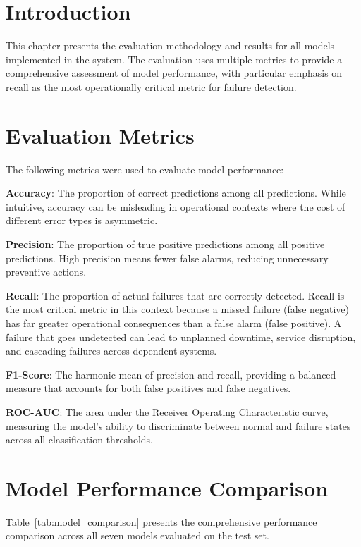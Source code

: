 \documentclass[12pt,letterpaper]{report}
\begin{document}
\section{Introduction}

This chapter presents the evaluation methodology and results for all models implemented in the system. The evaluation uses multiple metrics to provide a comprehensive assessment of model performance, with particular emphasis on recall as the most operationally critical metric for failure detection.

\section{Evaluation Metrics}

The following metrics were used to evaluate model performance:

\textbf{Accuracy}: The proportion of correct predictions among all predictions. While intuitive, accuracy can be misleading in operational contexts where the cost of different error types is asymmetric.

\textbf{Precision}: The proportion of true positive predictions among all positive predictions. High precision means fewer false alarms, reducing unnecessary preventive actions.

\textbf{Recall}: The proportion of actual failures that are correctly detected. Recall is the most critical metric in this context because a missed failure (false negative) has far greater operational consequences than a false alarm (false positive). A failure that goes undetected can lead to unplanned downtime, service disruption, and cascading failures across dependent systems.

\textbf{F1-Score}: The harmonic mean of precision and recall, providing a balanced measure that accounts for both false positives and false negatives.

\textbf{ROC-AUC}: The area under the Receiver Operating Characteristic curve, measuring the model's ability to discriminate between normal and failure states across all classification thresholds.

\section{Model Performance Comparison}

Table~\ref{tab:model_comparison} presents the comprehensive performance comparison across all seven models evaluated on the test set.
\end{document}
